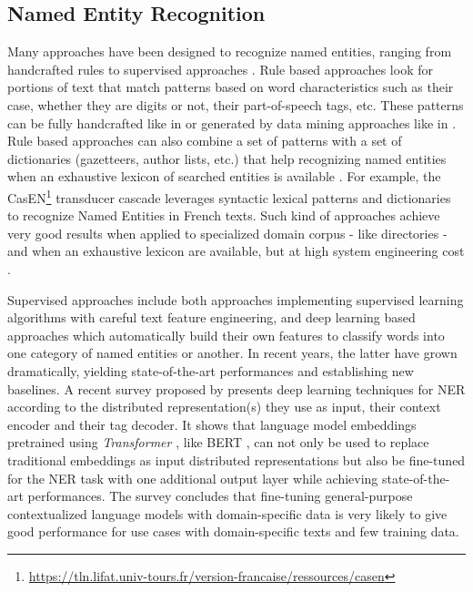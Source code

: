 \subsection{Named Entity Recognition}

Many approaches have been designed to recognize named entities, ranging from handcrafted rules to supervised approaches \cite{nadeau2007}. Rule based approaches look for portions of text that match patterns based on word characteristics such as their case, whether they are digits or not, their part-of-speech tags, etc. These patterns can be fully handcrafted like in \cite{bell2020automated} or generated by data mining approaches like in \cite{nouvel2011}. Rule based approaches can also combine a set of patterns with a set of dictionaries (gazetteers, author lists, etc.) that help recognizing named entities when an exhaustive lexicon of searched entities is available \cite{mansouri2008,maurel2011}. For example, the CasEN\footnote{\url{https://tln.lifat.univ-tours.fr/version-francaise/ressources/casen}} transducer cascade leverages syntactic lexical patterns and dictionaries to recognize Named Entities in French texts. Such kind of approaches achieve very good results when applied to specialized domain corpus - like directories - and when an exhaustive lexicon are available, but at high system engineering cost \cite{nadeau2007}. 

Supervised approaches include both approaches implementing supervised learning algorithms with careful text feature engineering, and deep learning based approaches which automatically build their own features to classify words into one category of named entities or another. In recent years, the latter have grown dramatically, yielding state-of-the-art performances and establishing new baselines\cite{li2020}. A recent survey proposed by \cite{li2020} presents deep learning techniques for NER according to the distributed representation(s) they use as input, their context encoder and their tag decoder. It shows that language model embeddings pretrained using \textit{Transformer} \cite{vaswani2017attention}, like BERT \cite{devlin2018bert}, can not only be used to replace traditional embeddings as input distributed representations but also be fine-tuned for the NER task with one additional output layer while achieving state-of-the-art performances. The survey concludes that fine-tuning general-purpose contextualized language models with domain-specific data is very likely to give good performance for use cases with domain-specific texts and few training data.

